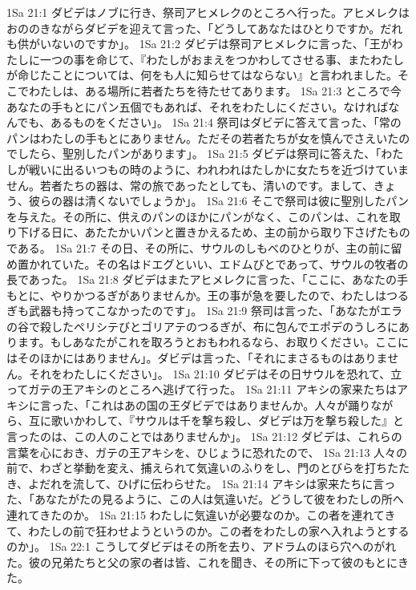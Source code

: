 1Sa 21:1  ダビデはノブに行き、祭司アヒメレクのところへ行った。アヒメレクはおののきながらダビデを迎えて言った、「どうしてあなたはひとりですか。だれも供がいないのですか」。
1Sa 21:2  ダビデは祭司アヒメレクに言った、「王がわたしに一つの事を命じて、『わたしがおまえをつかわしてさせる事、またわたしが命じたことについては、何をも人に知らせてはならない』と言われました。そこでわたしは、ある場所に若者たちを待たせてあります。
1Sa 21:3  ところで今あなたの手もとにパン五個でもあれば、それをわたしにください。なければなんでも、あるものをください」。
1Sa 21:4  祭司はダビデに答えて言った、「常のパンはわたしの手もとにありません。ただその若者たちが女を慎んでさえいたのでしたら、聖別したパンがあります」。
1Sa 21:5  ダビデは祭司に答えた、「わたしが戦いに出るいつもの時のように、われわれはたしかに女たちを近づけていません。若者たちの器は、常の旅であったとしても、清いのです。まして、きょう、彼らの器は清くないでしょうか」。
1Sa 21:6  そこで祭司は彼に聖別したパンを与えた。その所に、供えのパンのほかにパンがなく、このパンは、これを取り下げる日に、あたたかいパンと置きかえるため、主の前から取り下さげたものである。
1Sa 21:7  その日、その所に、サウルのしもべのひとりが、主の前に留め置かれていた。その名はドエグといい、エドムびとであって、サウルの牧者の長であった。
1Sa 21:8  ダビデはまたアヒメレクに言った、「ここに、あなたの手もとに、やりかつるぎがありませんか。王の事が急を要したので、わたしはつるぎも武器も持ってこなかったのです」。
1Sa 21:9  祭司は言った、「あなたがエラの谷で殺したペリシテびとゴリアテのつるぎが、布に包んでエポデのうしろにあります。もしあなたがこれを取ろうとおもわれるなら、お取りください。ここにはそのほかにはありません」。ダビデは言った、「それにまさるものはありません。それをわたしにください」。
1Sa 21:10  ダビデはその日サウルを恐れて、立ってガテの王アキシのところへ逃げて行った。
1Sa 21:11  アキシの家来たちはアキシに言った、「これはあの国の王ダビデではありませんか。人々が踊りながら、互に歌いかわして、『サウルは千を撃ち殺し、ダビデは万を撃ち殺した』と言ったのは、この人のことではありませんか」。
1Sa 21:12  ダビデは、これらの言葉を心におき、ガテの王アキシを、ひじょうに恐れたので、
1Sa 21:13  人々の前で、わざと挙動を変え、捕えられて気違いのふりをし、門のとびらを打ちたたき、よだれを流して、ひげに伝わらせた。
1Sa 21:14  アキシは家来たちに言った、「あなたがたの見るように、この人は気違いだ。どうして彼をわたしの所へ連れてきたのか。
1Sa 21:15  わたしに気違いが必要なのか。この者を連れてきて、わたしの前で狂わせようというのか。この者をわたしの家へ入れようとするのか」。
1Sa 22:1  こうしてダビデはその所を去り、アドラムのほら穴へのがれた。彼の兄弟たちと父の家の者は皆、これを聞き、その所に下って彼のもとにきた。
